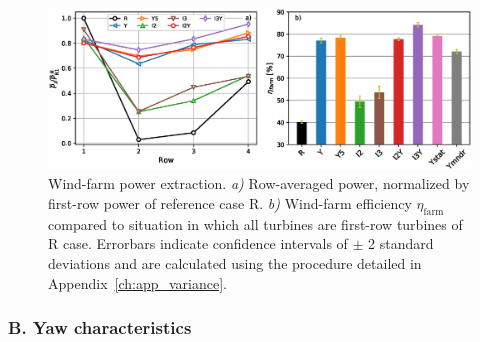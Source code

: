 	   
	
	
	\begin{figure}
		\includegraphics[width=\textwidth]{chapters/optimal_yaw_control/power_row_lam_eff.eps}
		\caption[Wind-farm power extraction and efficiency for uniform inflow.]{Wind-farm power extraction. \emph{a) } Row-averaged power, normalized by first-row power of reference case R. \emph{b) } Wind-farm efficiency $\eta_{\text{farm}}$ compared to situation in which all turbines are first-row turbines of R case. Errorbars indicate confidence intervals of $\pm$ 2 standard deviations and are calculated using the procedure detailed in Appendix~\ref{ch:app_variance}. \label{fig:power_uniform}}
	\end{figure}
	
	\subsubsection{B. Yaw characteristics}
	
